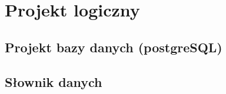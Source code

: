 \chapter{Projekt logiczny}
\label{cha:logiczny}

\section{Projekt bazy danych (postgreSQL)}
\label{sec:bazadanych}




\section{Słownik danych}
\label{sec:slownik}

